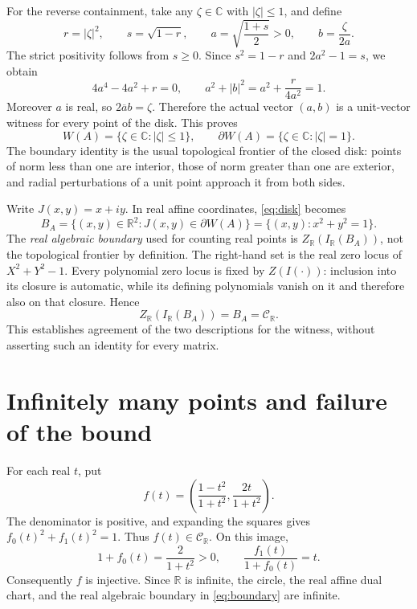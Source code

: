 \documentclass[10pt,letterpaper]{article}
\newcommand{\R}{\mathbb{R}}
\newcommand{\C}{\mathbb{C}}
\newcommand{\CC}{\mathcal{C}}
\begin{document}
For the reverse containment, take any $\zeta\in\C$ with $|\zeta|\le1$, and define
\begin{equation}\label{eq:unitwitness}
r=|\zeta|^2,\qquad s=\sqrt{1-r},\qquad
a=\sqrt{\frac{1+s}{2}}>0,\qquad b=\frac{\zeta}{2a}.
\end{equation}
The strict positivity follows from $s\ge0$. Since $s^2=1-r$ and $2a^2-1=s$, we obtain
\[
4a^4-4a^2+r=0,\qquad
a^2+|b|^2=a^2+\frac{r}{4a^2}=1.
\]
Moreover $a$ is real, so $2\overline a b=\zeta$. Therefore the actual vector $(a,b)$ is a unit-vector witness for every point of the disk. This proves
\begin{equation}\label{eq:disk}
W(A)=\{\zeta\in\C:|\zeta|\le1\},\qquad
\partial W(A)=\{\zeta\in\C:|\zeta|=1\}.
\end{equation}
The boundary identity is the usual topological frontier of the closed disk: points of norm less than one are interior, those of norm greater than one are exterior, and radial perturbations of a unit point approach it from both sides.

Write $J(x,y)=x+iy$. In real affine coordinates, \eqref{eq:disk} becomes
\[
B_A=\{(x,y)\in\R^2:J(x,y)\in\partial W(A)\}
=\{(x,y):x^2+y^2=1\}.
\]
The \emph{real algebraic boundary} used for counting real points is $Z_{\R}(I_{\R}(B_A))$, not the topological frontier by definition. The right-hand set is the real zero locus of $X^2+Y^2-1$. Every polynomial zero locus is fixed by $Z(I(\cdot))$: inclusion into its closure is automatic, while its defining polynomials vanish on it and therefore also on that closure. Hence
\begin{equation}\label{eq:boundary}
Z_{\R}(I_{\R}(B_A))=B_A=\CC_{\R}.
\end{equation}
This establishes agreement of the two descriptions for the witness, without asserting such an identity for every matrix.

\section{Infinitely many points and failure of the bound}
For each real $t$, put
\[
f(t)=\left(\frac{1-t^2}{1+t^2},\frac{2t}{1+t^2}\right).
\]
The denominator is positive, and expanding the squares gives $f_0(t)^2+f_1(t)^2=1$. Thus $f(t)\in\CC_{\R}$. On this image,
\[
1+f_0(t)=\frac{2}{1+t^2}>0,\qquad
\frac{f_1(t)}{1+f_0(t)}=t.
\]
Consequently $f$ is injective. Since $\R$ is infinite, the circle, the real affine dual chart, and the real algebraic boundary in \eqref{eq:boundary} are infinite.
\end{document}
